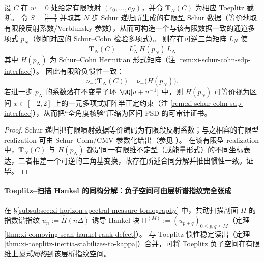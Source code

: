 \begin{theorem}\label{thm:xi-toeplitz-schur-cohn-inertia-alignment}
设 \(C\) 在 \(w=0\) 处给定有限喷射 \((c_0,\dots,c_N)\)，并令 \(\mathbf{T}_N(C)\) 为相应 Toeplitz 截断。
令 \(S=\frac{C-1}{C+1}\) 并取其 \(N\) 步 Schur 递归所生成的有限型 Schur 数据（等价地取有限段反射系数/Verblunsky 参数），从而可构造一个与该有限数据一致的通道多项式 \(p_N\)（例如对应的 Schur--Cohn 检验多项式）。
则存在可逆三角矩阵 \(L_N\) 使
\[
\boxed{\;
\mathbf{T}_N(C)\ =\ L_N^\ast\,H(p_N)\,L_N\;}
\]
其中 \(H(p_N)\) 为 Schur--Cohn Hermitian 形式矩阵（注 \ref{rem:xi-schur-cohn-sdp-interface}）。
因此有限阶负惯性一致：
\[
\boxed{\;
\nu_-\!\bigl(\mathbf{T}_N(C)\bigr)=\nu_-\!\bigl(H(p_N)\bigr).\;}
\]
若进一步 \(p_N\) 的系数落在不变量子环 \(\QQ[u+u^{-1}]\) 中，则 \(H(p_N)\) 可等价视为区间 \(x\in[-2,2]\) 上的一元多项式矩阵半正定约束（注 \ref{rem:xi-schur-cohn-sdp-interface}），从而把“全角度核验”压缩为区间 PSD 的可审计证书。
\end{theorem}

\begin{proof}
Schur 递归把有限喷射数据等价编码为有限段反射系数；与之相容的有限型 realization 可由 Schur--Cohn/CMV 参数化给出（参见 \cite{DymYoung1990SchurCohnMatrixPolynomials,Simon2005OPUC1}）。
在该有限型 realization 中，\(\mathbf{T}_N(C)\) 与 \(H(p_N)\) 都是同一有限维不定型（或能量形式）的不同坐标表达，二者相差一个可逆的三角基变换，故存在所述合同分解并推出惯性一致。证毕。
\end{proof}

\paragraph{Toeplitz--扫描 Hankel 的同构分解：负子空间可由层析谱指纹完全张成}
在 \S\ref{subsubsec:xi-horizon-spectral-measure-tomography} 中，共动扫描剖面 \(H\) 的指数谱指纹
\(
u_n:=\widehat H(n\Delta)
\)
诱导 Hankel 块 \(\mathsf H^{(M)}:=(u_{p+q})_{0\le p,q\le M}\)（定理 \ref{thm:xi-comoving-scan-hankel-rank-defect}）。
与 Toeplitz 惯性稳定读出（定理 \ref{thm:xi-toeplitz-inertia-stabilizes-to-kappa}）合并，可将 Toeplitz 负子空间在有限维上\emph{显式同构}到该层析指纹空间。

